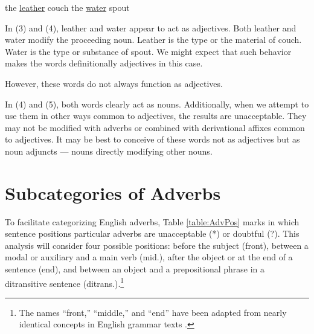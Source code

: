 \documentclass[doc,12pt,natbib]{apa6}
\begin{document}
\begin{exe}
	\ex the \underline{leather} couch
	\ex the \underline{water} spout
\end{exe}

In (3) and (4), leather and water appear to act as adjectives. Both leather and
water modify the proceeding noun. Leather is the type or the material of couch.
Water is the type or substance of spout. We might expect that such behavior
makes the words definitionally adjectives in this case.

However, these words do not always function as adjectives.
\begin{exe}
\end{exe}
In (4) and (5), both words clearly act as nouns. Additionally, when we attempt
to use them in other ways common to adjectives, the results are unacceptable.
They may not be modified with adverbs or combined with derivational affixes
common to adjectives.  It may be best to conceive of these words not as
adjectives but as noun adjuncts --- nouns directly modifying other nouns.

\section{Subcategories of Adverbs}

To facilitate categorizing English adverbs, Table \ref{table:AdvPos} marks in
which sentence positions particular adverbs are unacceptable (*) or doubtful
(?). This analysis will consider four possible positions: before the subject
(front), between a modal or auxiliary and a main verb (mid.), after the object
or at the end of a sentence (end), and between an object and a prepositional
phrase in a ditransitive sentence (ditrans.).\footnote{The names ``front,''
	``middle,'' and ``end'' have been adapted from nearly identical concepts in
	English grammar texts \citep{AdverbPlacement}.}
\end{document}
